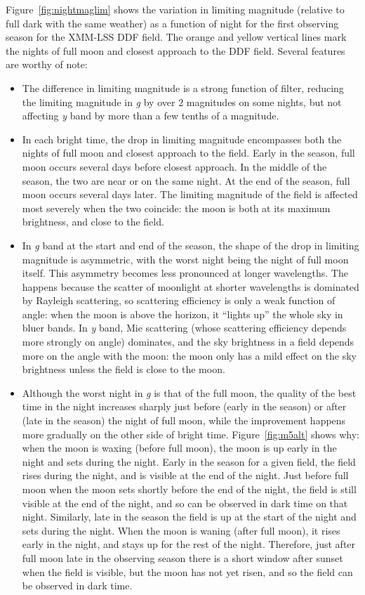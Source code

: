 \documentclass[DM,authoryear,toc]{lsstdoc}
\begin{document}
Figure~\ref{fig:nightmaglim} shows the variation in limiting magnitude (relative to full dark with the same weather) as a function of night for the first observing season for the XMM-LSS DDF field.
The orange and yellow vertical lines mark the nights of full moon and closest approach to the DDF field.
Several features are worthy of note:

\begin{itemize}
  \item The difference in limiting magnitude is a strong function of filter, reducing the limiting magnitude in {\it g} by over 2 magnitudes on some nights, but not affecting {\it y} band by more than a few tenths of a magnitude.
  \item In each bright time, the drop in limiting magnitude encompasses both the nights of full moon and closest approach to the field.
    Early in the season, full moon occurs several days before closest approach.
    In the middle of the season, the two are near or on the same night.
    At the end of the season, full moon occurs several days later.
    The limiting magnitude of the field is affected most severely when the two coincide: the moon is both at its maximum brightness, and close to the field.
  \item In {\it g} band at the start and end of the season, the shape of the drop in limiting magnitude is asymmetric, with the worst night being the night of full moon itself.
    This asymmetry becomes less pronounced at longer wavelengths.
    The happens because the scatter of moonlight at shorter wavelengths is dominated by Rayleigh scattering, so scattering efficiency is only a weak function of angle: when the moon is above the horizon, it ``lights up'' the whole sky in bluer bands.
    In {\it y} band, Mie scattering (whose scattering efficiency depends more strongly on angle) dominates, and the sky brightness in a field depends more on the angle with the moon: the moon only has a mild effect on the sky brightness unless the field is close to the moon.
  \item Although the worst night in {\it g} is that of the full moon, the quality of the best time in the night increases sharply just before (early in the season) or after (late in the season) the night of full moon, while the improvement happens more gradually on the other side of bright time.
    Figure~\ref{fig:m5alt} shows why: when the moon is waxing (before full moon), the moon is up early in the night and sets during the night. Early in the season for a given field, the field rises during the night, and is visible at the end of the night.
    Just before full moon when the moon sets shortly before the end of the night, the field is still visible at the end of the night, and so can be observed in dark time on that night.
    Similarly, late in the season the field is up at the start of the night and sets during the night.
    When the moon is waning (after full moon), it rises early in the night, and stays up for the rest of the night.
    Therefore, just after full moon late in the observing season there is a short window after sunset when the field is visible, but the moon has not yet risen, and so the field can be observed in dark time.
\end{itemize}
\end{document}
